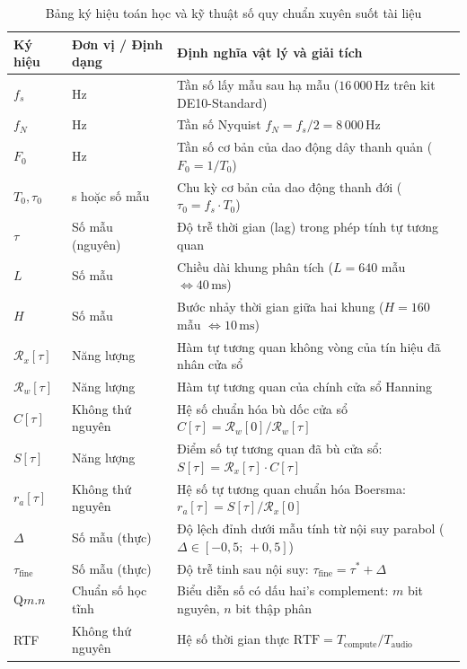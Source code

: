 \begin{table}[H]
\centering
\small
\caption{Bảng ký hiệu toán học và kỹ thuật số quy chuẩn xuyên suốt tài liệu}
\label{tab:ch01_symbols}
\begin{tabular}{@{}lll@{}}
\toprule
\textbf{Ký hiệu} & \textbf{Đơn vị / Định dạng} & \textbf{Định nghĩa vật lý và giải tích} \\
\midrule
$f_s$ & Hz & Tần số lấy mẫu sau hạ mẫu ($16\,000\,\text{Hz}$ trên kit DE10-Standard) \\
$f_N$ & Hz & Tần số Nyquist $f_N = f_s / 2 = 8\,000\,\text{Hz}$ \\
$F_0$ & Hz & Tần số cơ bản của dao động dây thanh quản ($F_0 = 1/T_0$) \\
$T_0, \tau_0$ & s hoặc số mẫu & Chu kỳ cơ bản của dao động thanh đới ($\tau_0 = f_s \cdot T_0$) \\
$\tau$ & Số mẫu (nguyên) & Độ trễ thời gian (lag) trong phép tính tự tương quan \\
$L$ & Số mẫu & Chiều dài khung phân tích ($L = 640$ mẫu $\Leftrightarrow 40\,\text{ms}$) \\
$H$ & Số mẫu & Bước nhảy thời gian giữa hai khung ($H = 160$ mẫu $\Leftrightarrow 10\,\text{ms}$) \\
$\mathcal{R}_x[\tau]$ & Năng lượng & Hàm tự tương quan không vòng của tín hiệu đã nhân cửa sổ \\
$\mathcal{R}_w[\tau]$ & Năng lượng & Hàm tự tương quan của chính cửa sổ Hanning \\
$C[\tau]$ & Không thứ nguyên & Hệ số chuẩn hóa bù dốc cửa sổ $C[\tau] = \mathcal{R}_w[0] / \mathcal{R}_w[\tau]$ \\
$S[\tau]$ & Năng lượng & Điểm số tự tương quan đã bù cửa sổ: $S[\tau] = \mathcal{R}_x[\tau] \cdot C[\tau]$ \\
$r_a[\tau]$ & Không thứ nguyên & Hệ số tự tương quan chuẩn hóa Boersma: $r_a[\tau] = S[\tau] / \mathcal{R}_x[0]$ \\
$\Delta$ & Số mẫu (thực) & Độ lệch đỉnh dưới mẫu tính từ nội suy parabol ($\Delta \in [-0{,}5;\, +0{,}5]$) \\
$\tau_{\mathrm{fine}}$ & Số mẫu (thực) & Độ trễ tinh sau nội suy: $\tau_{\mathrm{fine}} = \tau^* + \Delta$ \\
Q$m.n$ & Chuẩn số học tĩnh & Biểu diễn số có dấu hai's complement: $m$ bit nguyên, $n$ bit thập phân \\
RTF & Không thứ nguyên & Hệ số thời gian thực $\text{RTF} = T_{\mathrm{compute}} / T_{\mathrm{audio}}$ \\
\bottomrule
\end{tabular}
\end{table}

